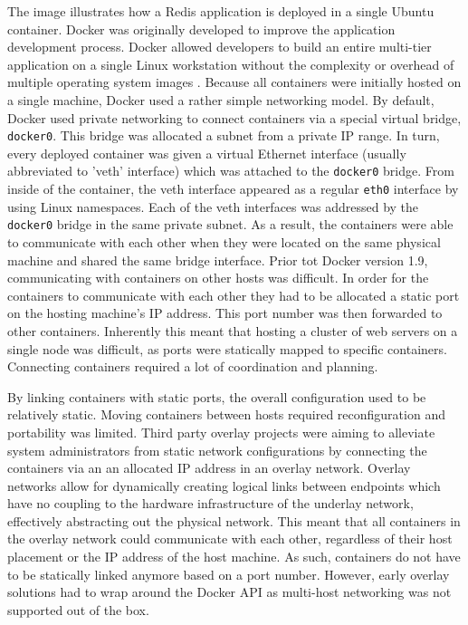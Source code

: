 The image illustrates how a Redis application is deployed in a single Ubuntu container. Docker was originally developed to improve the application development process. Docker allowed developers to build an entire multi-tier application on a single Linux workstation without the complexity or overhead of multiple operating system images \cite{techrepublic2015}. Because all containers were initially hosted on a single machine, Docker used a rather simple networking model. By default, Docker used private networking to connect containers via a special virtual bridge, \texttt{docker0}. This bridge was allocated a subnet from a private IP range. In turn, every deployed container was given a virtual Ethernet interface (usually abbreviated to 'veth' interface) which was attached to the \texttt{docker0} bridge. From inside of the container, the veth interface appeared as a regular \texttt{eth0} interface by using Linux namespaces. Each of the veth interfaces was addressed by the \texttt{docker0} bridge in the same private subnet. As a result, the containers were able to communicate with each other when they were located on the same physical machine and shared the same bridge interface. Prior tot Docker version 1.9, communicating with containers on other hosts was difficult. In order for the containers to communicate with each other they had to be allocated a static port on the hosting machine's IP address. This port number was then forwarded to other containers. Inherently this meant that hosting a cluster of web servers on a single node was difficult, as ports were statically mapped to specific containers. Connecting containers required a lot of coordination and planning. 

By linking containers with static ports, the overall configuration used to be relatively static. Moving containers between hosts required reconfiguration and portability was limited. Third party overlay projects were aiming to alleviate system administrators from static network configurations by connecting the containers via an an allocated IP address in an overlay network. Overlay networks allow for dynamically creating logical links between endpoints which have no coupling to the hardware infrastructure of the underlay network, effectively abstracting out the physical network. This meant that all containers in the overlay network could communicate with each other, regardless of their host placement or the IP address of the host machine. As such, containers do not have to be statically linked anymore based on a port number. However, early overlay solutions had to wrap around the Docker API as multi-host networking was not supported out of the box.

